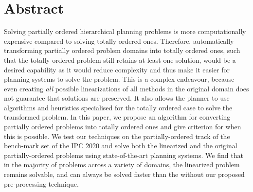 \chapter*{Abstract}

Solving partially ordered hierarchical planning problems is more computationally expensive compared to solving totally ordered ones. Therefore, automatically transforming partially ordered problem domains into totally ordered ones, such that the totally ordered problem still retains at least one solution, would be a desired capability as it would reduce complexity and thus make it easier for planning systems to solve the problem. This is a complex endeavour, because even creating \emph{all} possible linearizations of all methods in the original domain does not guarantee that solutions are preserved. 
It also allows the planner to use algorithms and heuristics specialised for the totally ordered case to solve the transformed problem. 
In this paper, we propose an algorithm for converting partially ordered problems into totally ordered ones and give criterion for when this is possible. We test our techniques on the partially-ordered track of the bench-mark set of the IPC 2020 and solve both the linearized and the original partially-ordered problems using state-of-the-art planning systems. We find that in the majority of problems across a variety of domains, the linearized problem remains solvable, and can always be solved faster than the without our proposed pre-processing technique.

